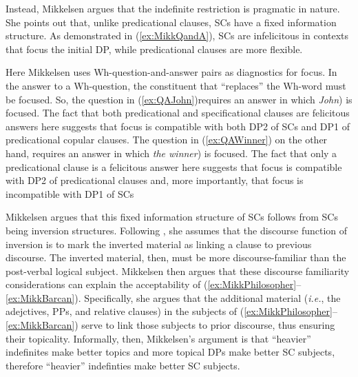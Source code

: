 \documentclass[
	letterpaper,
]{article}
\newcommand\quelle[1]{{%
  \unskip\nobreak\hfil\penalty50
  \hskip2em\hbox{}\nobreak\hfil#1%
  \parfillskip=0pt \finalhyphendemerits=0 \par}}
\begin{document}
Instead, Mikkelsen argues that the indefinite restriction is pragmatic in nature.
She points out \parencite[following, among others,][]{halliday1967notes} that, unlike predicational clauses, SCs have a fixed information structure.
As demonstrated in (\ref{ex:MikkQandA}), SCs are infelicitous in contexts that focus the initial DP, while predicational clauses are more flexible.
\begin{exe}
\ex\label{ex:MikkQandA}
\end{exe}
Here Mikkelsen uses Wh-question-and-answer pairs as diagnostics for focus.
In the answer to a Wh-question, the constituent that ``replaces'' the Wh-word must be focused.
So, the question in (\ref{ex:QAJohn})requires an answer in which \textit{John}) is focused.
The fact that both predicational and specificational clauses are felicitous answers here suggests that focus is compatible with both DP2 of SCs and DP1 of predicational copular clauses.
The question in (\ref{ex:QAWinner}) on the other hand, requires an answer in which \textit{the winner}) is focused.
The fact that only a predicational clause is a felicitous answer here suggests that focus is compatible with DP2 of predicational clauses and, more importantly, that focus is incompatible with DP1 of SCs

Mikkelsen argues that this fixed information structure of SCs follows from SCs being inversion structures.
Following \textcite{birner1994information,birner1996discourse}, she assumes that the discourse function of inversion is to mark the inverted material as linking a clause to previous discourse.
The inverted material, then, must be more discourse-familiar than the post-verbal logical subject.
Mikkelsen then argues that these discourse familiarity considerations can explain the acceptability of (\ref{ex:MikkPhilosopher}--\ref{ex:MikkBarcan}).
Specifically, she argues that the additional material (\textit{i.e.}, the adejctives, PPs, and relative clauses) in the subjects of (\ref{ex:MikkPhilosopher}--\ref{ex:MikkBarcan}) serve to link those subjects to prior discourse, thus ensuring their topicality.
Informally, then, Mikkelsen's argument is that ``heavier'' indefinites make better topics and more topical DPs make better SC subjects, therefore ``heavier'' indefinties make better SC subjects.
\end{document}
